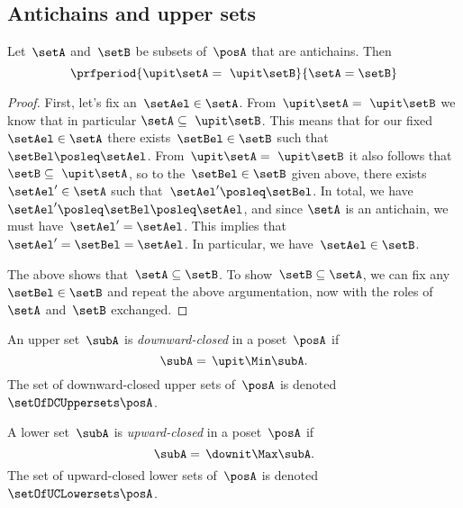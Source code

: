 \subsection{Antichains and upper sets}

\begin{lemma}
	\label{lem:up-cl-inj-antichains}
	Let~$\setA$ and~$\setB$ be subsets of~$\posA$ that are antichains.
	Then
	\begin{equation*}
		\prfperiod{\upit  \setA = \ \upit  \setB}{\setA = \setB}
	\end{equation*}
\end{lemma}

\begin{proof}
	First, let's fix an~$\setAel \in \setA$.
	From~$\upit  \setA = \ \upit  \setB$ we know that in particular $\setA \subseteq \ \upit  \setB$.
	This means that for our fixed~$\setAel \in \setA$ there exists~$\setBel \in \setB$ such that~$\setBel \posleq \setAel$.
	From~$\upit \setA = \ \upit  \setB$ it also follows that~$\setB \subseteq \ \upit  \setA$, so to the~$\setBel \in \setB$ given above, there exists~$\setAel' \in \setA$ such that~$\setAel' \posleq \setBel$.
	In total, we have~$\setAel' \posleq \setBel \posleq \setAel$, and since $\setA$ is an antichain, we must have~$\setAel' = \setAel$.
	This implies that~$\setAel' = \setBel = \setAel$.
	In particular, we have~$\setAel \in \setB$.

	The above shows that~$\setA \subseteq \setB$.
	To show~$\setB \subseteq \setA$, we can fix any~$\setBel \in \setB$ and repeat the above argumentation, now with the roles of~$\setA$ and~$\setB$ exchanged.
\end{proof}

\begin{definition}
	\label{def:downward-closed-upperset}
	An upper set~$\subA$ is \emph{downward-closed} in a poset~$\posA$ if
	\begin{equation}
		\subA =\, \upit  \Min \subA.
	\end{equation}
	The set of downward-closed upper sets of~$\posA$ is denoted~$\setOfDCUppersets \posA$.

\end{definition}

\begin{definition}
	\label{def:upward-closed-lowerset}
	A lower set~$\subA$ is \emph{upward-closed} in a poset~$\posA$ if
	\begin{equation}
		\subA =\, \downit  \Max \subA.
	\end{equation}
	The set of upward-closed lower sets of~$\posA$ is denoted~$\setOfUCLowersets \posA$.
\end{definition}
